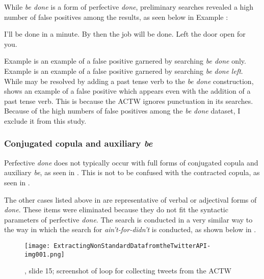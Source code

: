 \documentclass[output=paper,draftmode,colorlinks,citecolor=brown]{langscibook}
\begin{document}
While \textit{be done} is a form of perfective \textit{done}, preliminary searches revealed a high number of false positives among the results, as seen below in Example :

\ea%
    \label{ex:baxter:15}
    \ea \label{ex:baxter:15a} I’ll be done in a minute.
    \ex \label{ex:baxter:15b} By then the job will be done. Left the door open for you.
\z
\z

Example  is an example of a false positive garnered by searching \textit{be done} only. Example  is an example of a false positive garnered by searching \textit{be} \textit{done} \textit{left}. While  may be resolved by adding a past tense verb to the \textit{be done} construction,  shows an example of a false positive which appears even with the addition of a past tense verb. This is because the ACTW ignores punctuation in its searches. Because of the high numbers of false positives among the \textit{be} \textit{done} dataset, I exclude it from this study.

\subsubsection{Conjugated copula and auxiliary \textit{be}}

Perfective \textit{done} does not typically occur with full forms of conjugated copula and auxiliary \textit{be}, as seen in . This is not to be confused with the contracted copula, as seen in .

\ea%
    \label{ex:baxter:16}
\z
\z

The other cases listed above in  are representative of verbal or adjectival forms of \textit{done}. These items were eliminated because they do not fit the syntactic parameters of perfective \textit{done}. The search is conducted in a very similar way to the way in which the search for \textit{ain’t-for-didn’t} \citep{chapters/02-baxterEtAl} is conducted, as shown below in .

\begin{figure}
\texttt{[image: ExtractingNonStandardDatafromtheTwitterAPI-img001.png]}
\caption{\citet{chapters/02-baxterEtAl}, slide 15; screenshot of loop for collecting tweets from the ACTW}
\label{fig:baxter:1}
\end{figure}
\end{document}
